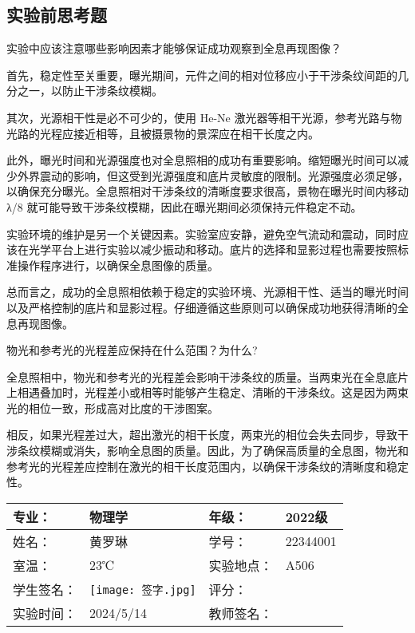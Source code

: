 \documentclass[dvipsnames, svgnames,a4paper,11pt]{article}
\begin{document}
	\subsection{实验前思考题}
		\begin{question}
			实验中应该注意哪些影响因素才能够保证成功观察到全息再现图像？
		\end{question}
			
		首先，稳定性至关重要，曝光期间，元件之间的相对位移应小于干涉条纹间距的几分之一，以防止干涉条纹模糊。
		
		其次，光源相干性是必不可少的，使用 He-Ne 激光器等相干光源，参考光路与物光路的光程应接近相等，且被摄景物的景深应在相干长度之内。

		此外，曝光时间和光源强度也对全息照相的成功有重要影响。缩短曝光时间可以减少外界震动的影响，但这受到光源强度和底片灵敏度的限制。光源强度必须足够，以确保充分曝光。全息照相对干涉条纹的清晰度要求很高，景物在曝光时间内移动 λ/8 就可能导致干涉条纹模糊，因此在曝光期间必须保持元件稳定不动。
		
		实验环境的维护是另一个关键因素。实验室应安静，避免空气流动和震动，同时应该在光学平台上进行实验以减少振动和移动。底片的选择和显影过程也需要按照标准操作程序进行，以确保全息图像的质量。
		
		总而言之，成功的全息照相依赖于稳定的实验环境、光源相干性、适当的曝光时间以及严格控制的底片和显影过程。仔细遵循这些原则可以确保成功地获得清晰的全息再现图像。
			
			
			
			
	
		\begin{question}
			物光和参考光的光程差应保持在什么范围？为什么?
		\end{question}
			
		全息照相中，物光和参考光的光程差会影响干涉条纹的质量。当两束光在全息底片上相遇叠加时，光程差小或相等时能够产生稳定、清晰的干涉条纹。这是因为两束光的相位一致，形成高对比度的干涉图案。

相反，如果光程差过大，超出激光的相干长度，两束光的相位会失去同步，导致干涉条纹模糊或消失，影响全息图的质量。因此，为了确保高质量的全息图，物光和参考光的光程差应控制在激光的相干长度范围内，以确保干涉条纹的清晰度和稳定性。
	
	\clearpage
	
	\begin{table}
		\renewcommand\arraystretch{1.7}
		\centering
		\begin{tabularx}{\textwidth}{|X|X|X|X|}
			\hline
			专业： & 物理学 & 年级： & 2022级 \\
			\hline
			姓名： & 黄罗琳 & 学号： &22344001 \\
			\hline
			室温： &23℃  & 实验地点： & A506 \\
			\hline
			学生签名：& \texttt{[image: 签字.jpg]} & 评分： &\\
			\hline
			实验时间：& 2024/5/14 & 教师签名：&\\
			\hline
		\end{tabularx}
	\end{table}
	
\end{document}
